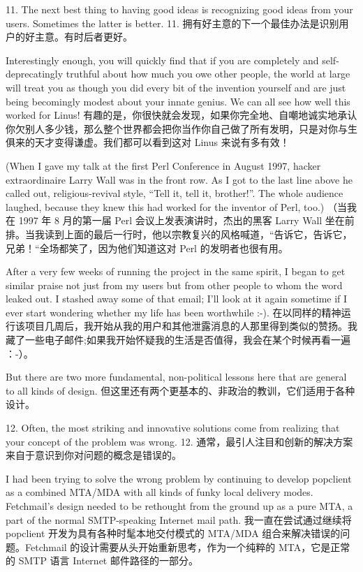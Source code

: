 \documentclass[a4paper,12pt,UTF8,twoside]{ctexbook}
\begin{document}
11. The next best thing to having good ideas is recognizing good ideas from your users. Sometimes the latter is better.
11. 拥有好主意的下一个最佳办法是识别用户的好主意。有时后者更好。

Interestingly enough, you will quickly find that if you are completely and self-deprecatingly truthful about how much you owe other people, the world at large will treat you as though you did every bit of the invention yourself and are just being becomingly modest about your innate genius. We can all see how well this worked for Linus!
有趣的是，你很快就会发现，如果你完全地、自嘲地诚实地承认你欠别人多少钱，那么整个世界都会把你当作你自己做了所有发明，只是对你与生俱来的天才变得谦虚。我们都可以看到这对 Linus 来说有多有效！

(When I gave my talk at the first Perl Conference in August 1997, hacker extraordinaire Larry Wall was in the front row. As I got to the last line above he called out, religious-revival style, ``Tell it, tell it, brother!''. The whole audience laughed, because they knew this had worked for the inventor of Perl, too.)
（当我在 1997 年 8 月的第一届 Perl 会议上发表演讲时，杰出的黑客 Larry Wall 坐在前排。当我读到上面的最后一行时，他以宗教复兴的风格喊道，“告诉它，告诉它，兄弟！“全场都笑了，因为他们知道这对 Perl 的发明者也很有用。

After a very few weeks of running the project in the same spirit, I began to get similar praise not just from my users but from other people to whom the word leaked out. I stashed away some of that email; I'll look at it again sometime if I ever start wondering whether my life has been worthwhile :-).
在以同样的精神运行该项目几周后，我开始从我的用户和其他泄露消息的人那里得到类似的赞扬。我藏了一些电子邮件;如果我开始怀疑我的生活是否值得，我会在某个时候再看一遍 ：-）。

But there are two more fundamental, non-political lessons here that are general to all kinds of design.
但这里还有两个更基本的、非政治的教训，它们适用于各种设计。

12. Often, the most striking and innovative solutions come from realizing that your concept of the problem was wrong.
12. 通常，最引人注目和创新的解决方案来自于意识到你对问题的概念是错误的。

I had been trying to solve the wrong problem by continuing to develop popclient as a combined MTA/MDA with all kinds of funky local delivery modes. Fetchmail's design needed to be rethought from the ground up as a pure MTA, a part of the normal SMTP-speaking Internet mail path.
我一直在尝试通过继续将 popclient 开发为具有各种时髦本地交付模式的 MTA/MDA 组合来解决错误的问题。Fetchmail 的设计需要从头开始重新思考，作为一个纯粹的 MTA，它是正常的 SMTP 语言 Internet 邮件路径的一部分。
\end{document}
